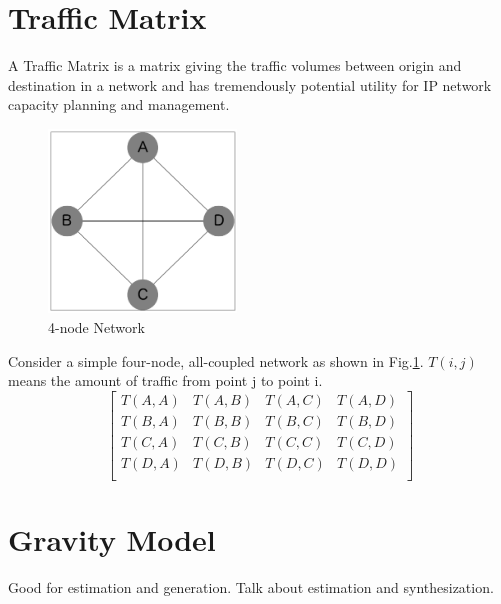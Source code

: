 \section{Traffic Matrix}
A Traffic Matrix is a matrix giving the traffic volumes between origin and destination in a network and has tremendously potential utility for IP network capacity planning and management.\cite{trafficmatrix}
\begin{figure}[!ht]
  \centering
  \includegraphics[width=5cm]{img/4node-graph.png}
  \caption{4-node Network}
  \label{fig:net} 
\end{figure}

\begin{screen}
  \begin{dfn}
    Consider a simple four-node, all-coupled network as shown in Fig.\ref{fig:net}.
    $T(i,j)$ means the amount of traffic from point j to point i. 
      \begin{equation}
          \begin{bmatrix}
            T(A,A) & T(A,B) & T(A,C) & T(A,D) \\
            T(B,A) & T(B,B) & T(B,C) & T(B,D) \\
            T(C,A) & T(C,B) & T(C,C) & T(C,D) \\
            T(D,A) & T(D,B) & T(D,C) & T(D,D) \\
          \end{bmatrix}
      \end{equation}
  \end{dfn}
\end{screen}


\section{Gravity Model}
Good for estimation and generation.
Talk about estimation and synthesization.


